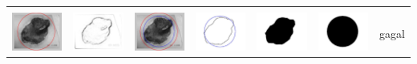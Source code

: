\begin{table}[H]
\begin{tabular}{|m{0.7in}|m{0.7in}|m{0.7in}|m{0.7in}|m{0.7in}|m{0.7in}|m{0.7in}|}
		&  &  & & & &  \\
		\includegraphics[width=0.7in]{dataset/dataset_3/luka_hitam/ready/26_integer_init.jpg}&
		\includegraphics[width=0.7in]{dataset/dataset_3/luka_hitam/ready/26_integer_ext.jpg}&
		\includegraphics[width=0.7in]{dataset/dataset_3/luka_hitam/ready/26_integer_result.jpg}&
		\includegraphics[width=0.7in]{dataset/dataset_3/luka_hitam/ready/26_gt_r_integer.jpg}&
		\includegraphics[width=0.7in]{dataset/dataset_3/luka_hitam/ready/26_r.jpg}&
		\includegraphics[width=0.7in]{dataset/dataset_3/luka_hitam/ready/26_integer_r.jpg}&
		gagal\\
		\hline
		

\end{tabular}
\end{table}
